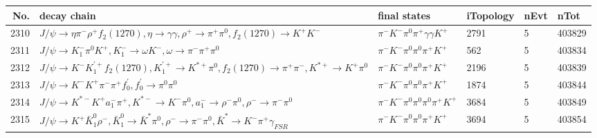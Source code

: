 \begin{table}[htbp] 
\begin{center}
\begin{small}
\begin{tabular}{rlllll}\hline\hline
 No. & decay chain & final states &  iTopology & nEvt & nTot \\\hline
2310&$J/\psi       \rightarrow \eta          \pi^{-}        \rho^{+}      f_{2}(1270)    , \eta           \rightarrow \gamma       \gamma       , \rho^{+}       \rightarrow \pi^{+}        \pi^{0}        , f_{2}(1270)     \rightarrow K^{+}          K^{-}          $&$\pi^{-}        K^{-}          \pi^{0}        \pi^{+}        \gamma       \gamma       K^{+}          $& 2791&    5&403829\\
2311&$J/\psi       \rightarrow K_{1}^{-}      \pi^{0}        K^{+}          , K_{1}^{-}       \rightarrow \omega         K^{-}          , \omega          \rightarrow \pi^{-}        \pi^{+}        \pi^{0}        $&$\pi^{-}        K^{-}          \pi^{0}        \pi^{0}        \pi^{+}        K^{+}          $&  562&    5&403834\\
2312&$J/\psi       \rightarrow K^{-}          K_1^{'+}      f_{2}(1270)    , K_1^{'+}       \rightarrow K^{*+}         \pi^{0}        , f_{2}(1270)     \rightarrow \pi^{+}        \pi^{-}        , K^{*+}          \rightarrow K^{+}          \pi^{0}        $&$\pi^{-}        K^{-}          \pi^{0}        \pi^{0}        \pi^{+}        K^{+}          $& 2196&    5&403839\\
2313&$J/\psi       \rightarrow K^{-}          K^{+}          \pi^{-}        \pi^{+}        f^{'}_{0}     , f^{'}_{0}      \rightarrow \pi^{0}        \pi^{0}        $&$\pi^{-}        K^{-}          \pi^{0}        \pi^{0}        \pi^{+}        K^{+}          $& 1874&    5&403844\\
2314&$J/\psi       \rightarrow K^{*-}         K^{+}          a_{1}^{-}      \pi^{+}        , K^{*-}          \rightarrow K^{-}          \pi^{0}        , a_{1}^{-}       \rightarrow \rho^{-}      \pi^{0}        , \rho^{-}       \rightarrow \pi^{-}        \pi^{0}        $&$\pi^{-}        K^{-}          \pi^{0}        \pi^{0}        \pi^{0}        \pi^{+}        K^{+}          $& 3684&    5&403849\\
2315&$J/\psi       \rightarrow K^{+}          \bar{K}_1^{0} \rho^{-}      , \bar{K}_1^{0}  \rightarrow \bar{K}^{*}   \pi^{0}        , \rho^{-}       \rightarrow \pi^{-}        \pi^{0}        , \bar{K}^{*}    \rightarrow K^{-}          \pi^{+}        \gamma_{FSR} $&$\pi^{-}        K^{-}          \pi^{0}        \pi^{0}        \pi^{+}        K^{+}          $& 3694&    5&403854\\

\end{tabular}
\end{small}
\end{center}
\end{table}
